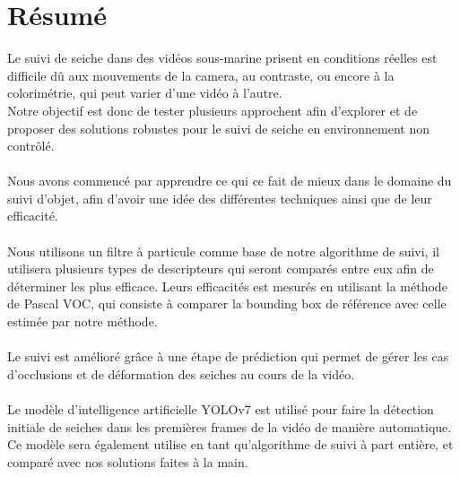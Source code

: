 \chapter*{Résumé}
Le suivi de seiche dans des vidéos sous-marine prisent en conditions réelles est difficile dû aux mouvements de la camera, au contraste, ou encore à la colorimétrie, qui peut varier d'une vidéo à l'autre.\\
Notre objectif est donc de tester plusieurs approchent afin d'explorer et de proposer des solutions robustes pour le suivi de seiche en environnement non contrôlé.\\
\\
Nous avons commencé par apprendre ce qui ce fait de mieux dans le domaine du suivi d'objet, afin d'avoir une idée des différentes techniques ainsi que de leur efficacité.\\
\\
Nous utilisons un filtre à particule comme base de notre algorithme de suivi, il utilisera plusieurs types de descripteurs qui seront comparés entre eux afin de déterminer les plus efficace. Leurs efficacités est mesurés en utilisant la méthode de Pascal VOC, qui consiste à comparer la bounding box de référence avec celle estimée par notre méthode.\\
\\
Le suivi est amélioré grâce à une étape de prédiction qui permet de gérer les cas d'occlusions et de déformation des seiches au cours de la vidéo.\\
\\
Le modèle d'intelligence artificielle YOLOv7 est utilisé pour faire la détection initiale de seiches dans les premières frames de la vidéo de manière automatique.\\
Ce modèle sera également utilise en tant qu'algorithme de suivi à part entière, et comparé avec nos solutions faites à la main.\\


\clearpage